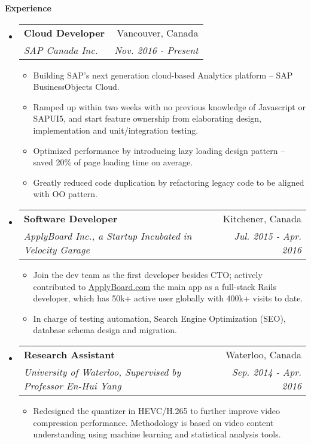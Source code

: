\documentclass[letterpaper,10pt]{article}
\makeatletter
\newcommand{\resitem}[1]{\item #1 \vspace{-2pt}}
\newcommand{\resheading}[1]{{\large \colorbox{mygrey}{\begin{minipage}{\textwidth}{\textbf{#1 \vphantom{p\^{E}}}}\end{minipage}}}}
\newcommand{\ressubheading}[4]{
\begin{tabular*}{7.0in}{l@{\extracolsep{\fill}}r}
		\textbf{#1} & #2 \\
		\textit{#3} & \textit{#4} \\
\end{tabular*}\vspace{-6pt}}
\makeatother
\begin{document}
\resheading{Experience}
\begin{itemize}
\itemsep0em
\item
    \ressubheading{Cloud Developer}{Vancouver, Canada}{SAP Canada Inc.}{ Nov. 2016 - Present}
	\begin{itemize}
        \resitem{Building SAP's next generation cloud-based Analytics platform -- SAP BusinessObjects Cloud.}
        \resitem{Ramped up within two weeks with no previous knowledge of Javascript or SAPUI5, and start feature ownership from elaborating design, implementation and unit/integration testing.}
        \resitem{Optimized performance by introducing lazy loading design pattern -- saved 20\% of page loading time on average.}
        \resitem{Greatly reduced code duplication by refactoring legacy code to be aligned with OO pattern.}
	\end{itemize}
\item
    \ressubheading{Software Developer}{Kitchener, Canada}{ApplyBoard Inc., a Startup Incubated in Velocity Garage}{ Jul. 2015 - Apr. 2016}
	\begin{itemize}
        \resitem{Join the dev team as the first developer besides CTO; actively contributed to \href{https://www.applyboard.com/student}{ApplyBoard.com} the main app as a full-stack Rails developer, which has 50k+ active user globally with 400k+ visits to date.}
		\resitem{In charge of testing automation, Search Engine Optimization (SEO), database schema design and migration.}
	\end{itemize}
\item
	\ressubheading{Research Assistant}{Waterloo, Canada}{University of Waterloo, Supervised by Professor En-Hui Yang}{Sep. 2014 - Apr. 2016}
	\begin{itemize}
		\resitem{Redesigned the quantizer in HEVC/H.265 to further improve video compression performance. Methodology is based on video content understanding using machine learning and statistical analysis tools.}
	\end{itemize}
\end{itemize}
\end{document}
